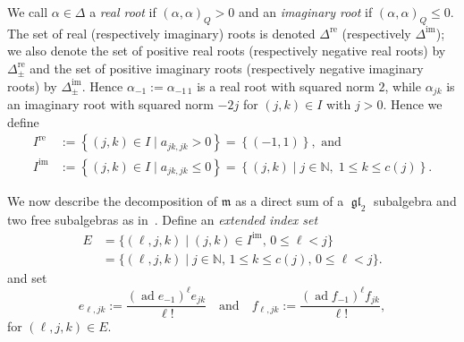\documentclass[11pt,letterpaper]{amsart}
\numberwithin{thecounter}{section}
\theoremstyle{definition}
\DeclareMathOperator{\gl}{\mathfrak{gl}}
\DeclareMathOperator{\ad}{ad}
\DeclareMathOperator{\re}{{re}}
\DeclareMathOperator{\im}{{im}}
\renewcommand{\a}{\alpha}
\newcommand{\C}{{\mathbb C}}
\newcommand{\N}{{\mathbb N}}
\begin{document}
We call $\a\in\Delta$ a \emph{real root} if $(\alpha, \alpha)_Q>0$ and an \emph{imaginary root} if $(\alpha, \alpha)_Q\le0$. 
The set of real (respectively imaginary) roots is denoted $\Delta^{\re}$ (respectively $\Delta^{\im}$); 
we also denote the set of  positive real roots (respectively  negative real roots) by $\Delta^{\re}_{\pm}$ and the set of  positive imaginary roots (respectively   negative imaginary roots) by $\Delta^{\im}_{\pm}$.
Hence $\a_{-1}:=\a_{-1\,1}$ is a real root with squared norm $2$, while $\a_{jk}$ is an imaginary root
with squared norm $-2j$ for $(j,k)\in I$ with $j>0$.
Hence  we define
\begin{align*}
I^{\re}&:= \left\{ (j,k)\in I \mid a_{jk,jk}>0 \right\}=\left\{(-1,1) \right\}, \text{ and} \\
I^{\im} &:= \left\{ (j,k)\in I \mid a_{jk,jk}\le0 \right\}= \left\{(j,k)\mid j\in\N,\; 1 \leq k\leq c(j) \right\}.
\end{align*}

We now describe the  decomposition of $\mathfrak m$ as a direct sum of a $\gl_2$ subalgebra and two free subalgebras as in~\cite{JurJPAA}.
Define an \emph{extended index set}
\begin{align*}
 E &= \{(\ell,j,k)\mid( j,k)\in I^{\im},\, 0\leq \ell<j \}\\ &= \{(\ell,j,k)\mid j\in\N,\, 1 \leq k\leq c(j),\, 0\leq \ell<j \}.
 \end{align*}
and set
$$
   e_{\ell,jk}:= \frac{\left(\ad e_{-1} \right)^\ell e_{jk}}{\ell!}\quad\text{and}\quad f_{\ell,jk}:= \frac{\left(\ad f_{-1} \right)^\ell f_{jk}}{\ell!},
$$
for $ (\ell,j,k) \in E$.
\end{document}

